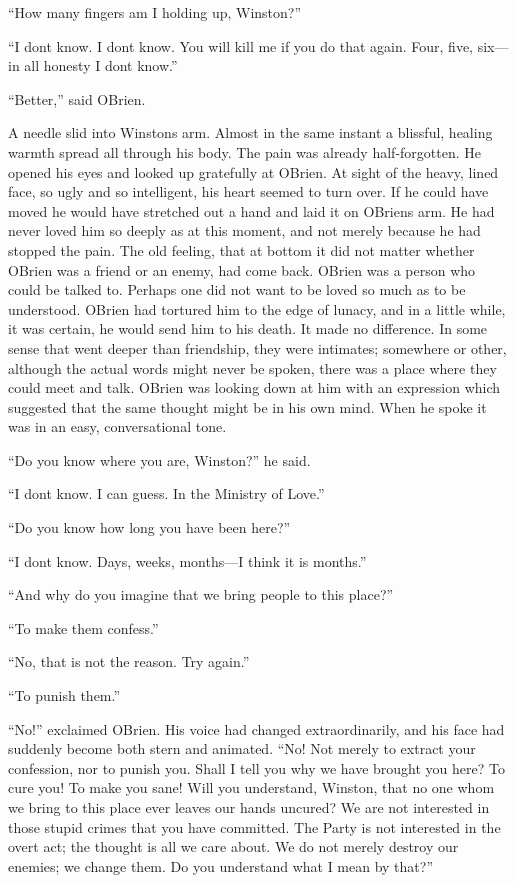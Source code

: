 ``How many fingers am I holding up, Winston?''

``I don\textquotesingle t know. I don\textquotesingle t know. You will
kill me if you do that again. Four, five, six---in all honesty I
don\textquotesingle t know.''

``Better,'' said O\textquotesingle Brien.

A needle slid into Winston\textquotesingle s arm. Almost in the same
instant a blissful, healing warmth spread all through his body. The pain
was already half-forgotten. He opened his eyes and looked up gratefully
at O\textquotesingle Brien. At sight of the heavy, lined face, so ugly
and so intelligent, his heart seemed to turn over. If he could have
moved he would have stretched out a hand and laid it on
O\textquotesingle Brien\textquotesingle s arm. He had never loved him so
deeply as at this moment, and not merely because he had stopped the
pain. The old feeling, that at bottom it did not matter whether
O\textquotesingle Brien was a friend or an enemy, had come back.
O\textquotesingle Brien was a person who could be talked to. Perhaps one
did not want to be loved so much as to be understood.
O\textquotesingle Brien had tortured him to the edge of lunacy, and in a
little while, it was certain, he would send him to his death. It made no
difference. In some sense that went deeper than friendship, they were
intimates; somewhere or other, although the actual words might never be
spoken, there was a place where they could meet and talk.
O\textquotesingle Brien was looking down at him with an expression which
suggested that the same thought might be in his own mind. When he spoke
it was in an easy, conversational tone.

``Do you know where you are, Winston?'' he said.

``I don\textquotesingle t know. I can guess. In the Ministry of Love.''

``Do you know how long you have been here?''

``I don\textquotesingle t know. Days, weeks, months---I think it is
months.''

``And why do you imagine that we bring people to this place?''

``To make them confess.''

``No, that is not the reason. Try again.''

``To punish them.''

``No!'' exclaimed O\textquotesingle Brien. His voice had changed
extraordinarily, and his face had suddenly become both stern and
animated. ``No! Not merely to extract your confession, nor to punish you.
Shall I tell you why we have brought you here? To cure you! To make you
sane! Will you understand, Winston, that no one whom we bring to this
place ever leaves our hands uncured? We are not interested in those
stupid crimes that you have committed. The Party is not interested in
the overt act; the thought is all we care about. We do not merely
destroy our enemies; we change them. Do you understand what I mean by
that?''

